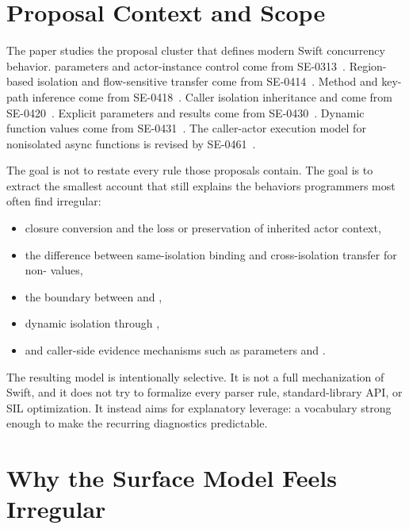 \section{Proposal Context and Scope}
\label{sec:proposal-context}

The paper studies the proposal cluster that defines modern Swift concurrency behavior.  parameters and actor-instance control come from SE-0313~\cite{se0313}. Region-based isolation and flow-sensitive transfer come from SE-0414~\cite{se0414}. Method and key-path  inference come from SE-0418~\cite{se0418}. Caller isolation inheritance and  come from SE-0420~\cite{se0420}. Explicit  parameters and results come from SE-0430~\cite{se0430}. Dynamic  function values come from SE-0431~\cite{se0431}. The caller-actor execution model for nonisolated async functions is revised by SE-0461~\cite{se0461}.

The goal is not to restate every rule those proposals contain. The goal is to extract the smallest account that still explains the behaviors programmers most often find irregular:

\begin{itemize}
  \item closure conversion and the loss or preservation of inherited actor context,
  \item the difference between same-isolation binding and cross-isolation transfer for non- values,
  \item the boundary between  and ,
  \item dynamic isolation through ,
  \item and caller-side evidence mechanisms such as  parameters and .
\end{itemize}

The resulting model is intentionally selective. It is not a full mechanization of Swift, and it does not try to formalize every parser rule, standard-library API, or SIL optimization. It instead aims for explanatory leverage: a vocabulary strong enough to make the recurring diagnostics predictable.

\section{Why the Surface Model Feels Irregular}
\label{sec:irregular}

